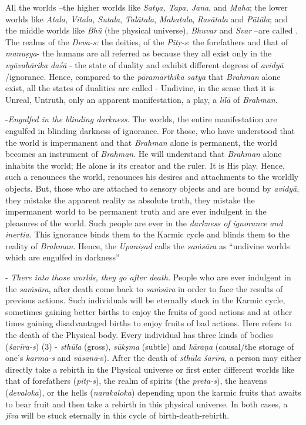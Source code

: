All the worlds --the higher worlds like \emph{Satya, Tapa, Jana}, and \emph{Maha}; the lower worlds like \emph{Atala, Vitala, Sutala}, \emph{Talātala}, \emph{Mahatala}, \emph{Rasātala} and \emph{Pātāla}; and the middle worlds like \emph{Bhū} (the physical universe), \emph{Bhuvar} and \emph{Svar} --are called . The realms of the \emph{Deva-s:} the deities, of the \emph{Pitṛ-s}: the forefathers and that of \emph{manuṣya}- the humans are all referred as  because they all exist only in the \emph{vyāvahārika daśā} - the state of duality and exhibit different degrees of \emph{avidyā} /ignorance. Hence, compared to the \emph{pāramārthika satya} that \emph{Brahman} alone exist, all the states of dualities are called - Undivine, in the sense that it is Unreal, Untruth, only an apparent manifestation, a play, a \emph{līlā} of \emph{Brahman}.

-\emph{Engulfed in the blinding darkness}. The worlds, the entire manifestation are engulfed in blinding darkness of ignorance. For those, who have understood that the world is impermanent and that \emph{Brahman} alone is permanent, the world becomes an instrument of \emph{Brahman}. He will understand that \emph{Brahman} alone inhabits the world; He alone is its creator and the ruler. It is His play. Hence, such a renounces the world, renounces his desires and attachments to the worldly objects. But, those who are attached to sensory objects and are bound by \emph{avidyā}, they mistake the apparent reality as absolute truth, they mistake the impermanent world to be permanent truth and are ever indulgent in the pleasures of the world. Such people are ever in the \emph{darkness of} \emph{ignorance} \emph{and} \emph{inertia}. This ignorance binds them to the Karmic cycle and blinds them to the reality of \emph{Brahman}. Hence, the \emph{Upaniṣad} calls the \emph{saṁsāra} as ``undivine worlds which are engulfed in darkness''

- \emph{There into those worlds, they go after death.} People who are ever indulgent in the \emph{saṁsāra}, after death come back to \emph{saṁsāra} in order to face the results of previous actions. Such individuals will be eternally stuck in the Karmic cycle, sometimes gaining better births to enjoy the fruits of good actions and at other times gaining disadvantaged births to enjoy fruits of bad actions. Here  refers to the death of the Physical body. Every individual has three kinds of bodies (\emph{śarīra-s}) (3) - \emph{sthūla} (gross), \emph{sūkṣma} (subtle) and \emph{kāraṇa} (causal/the storage of one's \emph{karma-s} and \emph{vāsanā}-s). After the death of \emph{sthūla śarīra}, a person may either directly take a rebirth in the Physical universe or first enter different worlds like that of forefathers (\emph{pitṛ-s}), the realm of spirits (the \emph{preta-s}), the heavens (\emph{devaloka}), or the hells (\emph{narakaloka}) depending upon the karmic fruits that awaits to bear fruit and then take a rebirth in this physical universe. In both cases, a \emph{jīva} will be stuck eternally in this cycle of birth-death-rebirth.

